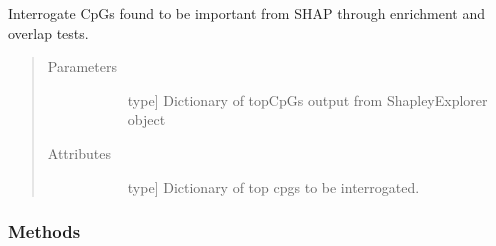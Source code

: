 \documentclass[letterpaper,10pt,english]{sphinxmanual}
\begin{document}
\begin{fulllineitems}
\label{\detokenize{index:methylnet.interpretation_classes.BioInterpreter}}
Interrogate CpGs found to be important from SHAP through enrichment and overlap tests.
\begin{quote}\begin{description}
\item[{Parameters}] \leavevmode\begin{description}
\item[{}] \leavevmode{[}type{]}
Dictionary of topCpGs output from ShapleyExplorer object

\end{description}

\item[{Attributes}] \leavevmode\begin{description}
\item[{}] \leavevmode{[}type{]}
Dictionary of top cpgs to be interrogated.

\end{description}

\end{description}\end{quote}
\subsubsection*{Methods}


\begin{savenotes}\sphinxatlongtablestart\begin{longtable}{}
\hline

\endfirsthead

%
{}\\
\hline

\endhead

\hline
{}\\
\endfoot

\endlastfoot


\end{longtable}
\end{savenotes}
\end{fulllineitems}
\end{document}
